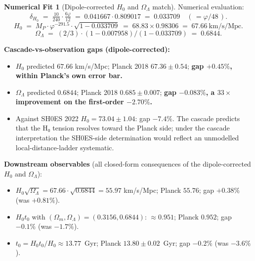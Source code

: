 \documentclass[11pt]{article}
\theoremstyle{plain}
\theoremstyle{definition}
\newtheorem{numfit}[theorem]{Numerical Fit}
\theoremstyle{remark}
\begin{document}
\begin{numfit}[Dipole-corrected $H_0$ and $\Omega_\Lambda$ match]\label{nf:H0-dipole}
Numerical evaluation:
\[
  \delta_{H_0} \;=\; \tfrac{10}{240} \cdot \tfrac{6\varphi}{12} \;=\; 0.041667 \cdot 0.809017 \;=\; 0.033709 \quad(\,= \varphi/48\,).
\]
\[
  H_0 \;=\; M_P \cdot \varphi^{-291.5} \cdot \sqrt{1 - 0.033709} \;=\; 68.83 \times 0.98306 \;=\; 67.66~\text{km/s/Mpc}.
\]
\[
  \Omega_\Lambda \;=\; (2/3) \cdot (1 - 0.007958)/(1 - 0.033709) \;=\; 0.6844.
\]

\textbf{Cascade-vs-observation gaps (dipole-corrected):}
\begin{itemize}[leftmargin=2em]
\item $H_0$ predicted $67.66$ km/s/Mpc; Planck 2018 $67.36 \pm 0.54$; \textbf{gap $+0.45\%$, within Planck's own error bar.}
\item $\Omega_\Lambda$ predicted $0.6844$; Planck 2018 $0.685 \pm 0.007$; \textbf{gap $-0.083\%$, a $33\times$ improvement on the first-order $-2.70\%$.}
\item Against SH0ES 2022 $H_0 = 73.04 \pm 1.04$: gap $-7.4\%$. The cascade predicts that the H₀ tension resolves toward the Planck side; under the cascade interpretation the SH0ES-side determination would reflect an unmodelled local-distance-ladder systematic.
\end{itemize}

\textbf{Downstream observables} (all closed-form consequences of the dipole-corrected $H_0$ and $\Omega_\Lambda$):
\begin{itemize}[leftmargin=2em]
\item $H_0\sqrt{\Omega_\Lambda} = 67.66 \cdot \sqrt{0.6844} = 55.97$ km/s/Mpc; Planck $55.76$; gap $+0.38\%$ (was $+0.81\%$).
\item $H_0 t_0$ with $(\Omega_m, \Omega_\Lambda) = (0.3156, 0.6844)$: $\approx 0.951$; Planck $0.952$; gap $-0.1\%$ (was $-1.7\%$).
\item $t_0 = H_0 t_0 / H_0 \approx 13.77$~Gyr; Planck $13.80 \pm 0.02$~Gyr; gap $-0.2\%$ (was $-3.6\%$).
\end{itemize}


\end{numfit}
\end{document}

